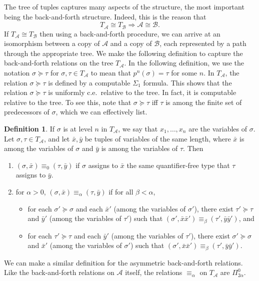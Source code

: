 \documentclass{article}
\theoremstyle{definition}
\newtheorem{defn}[thm]{Definition}
\begin{document}
	The tree of tuples captures many aspects of the structure, the most important being the back-and-forth structure. Indeed, this is the reason that
	\[ T_{\mathcal{A}} \cong T_{\mathcal{B}} \Longrightarrow \mathcal{A} \cong \mathcal{B}.\]
	If $T_{\mathcal{A}} \cong T_{\mathcal{B}}$ then using a back-and-forth procedure, we can arrive at an isomorphism between a copy of $\mathcal{A}$ and a copy of $\mathcal{B}$, each represented by a path through the appropriate tree. We make the following definition to capture the back-and-forth relations on the tree $T_{\mathcal{A}}$. 
	In the following definition, we use the notation $\sigma\succeq\tau$ for $\sigma,\tau \in T_{\mathcal{A}}$ to mean that $p^n(\sigma)=\tau$ for some $n$.
	In $T_{\mathcal{A}}$, the relation $\sigma\succeq\tau$ is defined by a computable $\Sigma_1$ formula. This shows that the relation $\sigma\succeq\tau$ is uniformly c.e.\ relative to the tree. In fact, it is computable relative to the tree. To see this, note that $\sigma\succeq\tau$ iff $\tau$ is among the finite set of predecessors of $\sigma$, which we can effectively list. 
		
	\begin{defn}
		 If $\sigma$ is at level $n$ in $T_\mathcal{A}$, we say that $x_1,\ldots,x_n$ are the variables of $\sigma$.  Let $\sigma,\tau \in T_{\mathcal{A}}$, and let $\bar{x},\bar{y}$ be tuples of variables of the same length, where $\bar{x}$ is among the variables of $\sigma$ and $\bar{y}$ is among the variables of $\tau$.  Then 
		
				\begin{enumerate}
			\item $(\sigma,\bar{x}) \equiv_0 (\tau,\bar{y})$ if $\sigma$ assigns to $\bar{x}$ the same quantifier-free type that $\tau$ assigns to $\bar{y}$.
			\item for $\alpha > 0$, $(\sigma,\bar{x}) \equiv_\alpha (\tau,\bar{y})$ if for all $\beta < \alpha$,
			\begin{itemize}
				\item for each $\sigma' \succeq \sigma$ and each $\bar{x}'$  (among the variables of $\sigma'$), there exist $\tau' \succeq \tau$ and $\bar{y}'$ (among the variables of $\tau'$) such that $(\sigma',\bar{x}\bar{x}') \equiv_\beta (\tau',\bar{y}\bar{y}')$, and
				\item for each $\tau' \succeq \tau$ and each $\bar{y}'$ (among the variables of $\tau'$), there exist $\sigma' \succeq \sigma$ and $\bar{x}'$ (among the variables of $\sigma'$) such that $(\sigma',\bar{x}\bar{x}') \equiv_\beta (\tau',\bar{y}\bar{y}')$.
			\end{itemize}
		\end{enumerate}
		We can make a similar definition for the asymmetric back-and-forth relations. Like the back-and-forth relations on $\mathcal{A}$ itself, the relations $\equiv_\alpha$ on $T_\mathcal{A}$ are $\Pi^0_{2\alpha}$.
	\end{defn}
	
\end{document}
